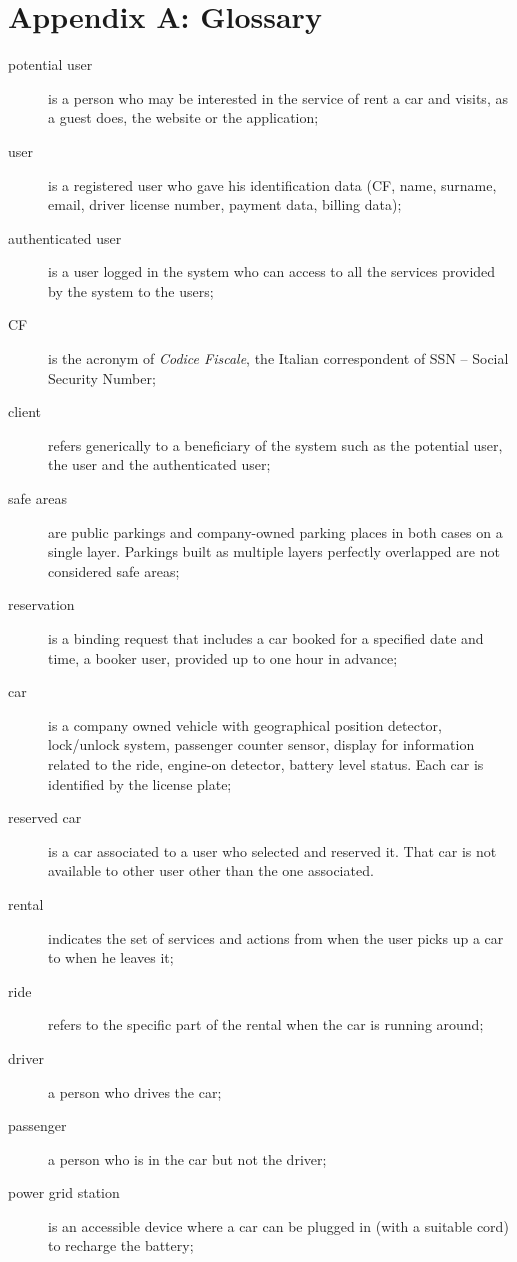\documentclass{scrreprt}
\begin{document}
\section{Appendix A: Glossary}
\label{sec:glossary}
\begin{description}
\item [potential user] is a person who may be interested in the service of rent a car and visits, as a guest does, the website or the application;
\item [user] is a registered user who gave his identification data (CF, name, surname, email, driver license number, payment data, billing data);
\item [authenticated user] is a user logged in the system who can access to all the services provided by the system to the users;
\item [CF] is the acronym of \emph{Codice Fiscale}, the Italian correspondent of SSN -- Social Security Number;
\item [client] refers generically to a beneficiary of the system such as the potential user, the user and the authenticated user;
\item [safe areas] are public parkings and company-owned parking places in both cases on a single layer. Parkings built as multiple layers perfectly overlapped are not considered safe areas;
\item [reservation] is a binding request that includes a car booked for a specified date and time, a booker user, provided up to one hour in advance;
\item [car] is a company owned vehicle with geographical position detector, lock/unlock system, passenger counter sensor, display for information related to the ride, engine-on detector, battery level status. Each car is identified by the license plate;
\item [reserved car] is a car associated to a user who selected and reserved it. That car is not available to other user other than the one associated.
\item [rental] indicates the set of services and actions from when the user picks up a car to when he leaves it;
\item [ride] refers to the specific part of the rental when the car is running around;
\item [driver] a person who drives the car;
\item [passenger] a person who is in the car but not the driver;
\item [power grid station] is an accessible device where a car can be plugged in (with a suitable cord) to recharge the battery;

\end{description}
\end{document}
